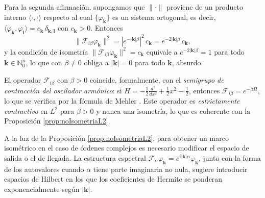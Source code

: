 \begin{Proof}
                Para la segunda afirmación, supongamos que $\|\cdot\|$ proviene de un producto interno $\langle\cdot,\cdot\rangle$ respecto al cual $\{\varphi_{\boldsymbol{k}}\}$ es un sistema ortogonal, es decir, $\langle \varphi_{\boldsymbol{k}},\varphi_{\boldsymbol{l}}\rangle = c_{\boldsymbol{k}}\,\delta_{\boldsymbol{k},\boldsymbol{l}}$ con $c_{\boldsymbol{k}}>0$. Entonces
                \begin{equation*}
                    \|\mathcal{F}_{i\beta}\varphi_{\boldsymbol{k}}\|^2 = |e^{-|\boldsymbol{k}|\beta}|^2\, c_{\boldsymbol{k}} = e^{-2|\boldsymbol{k}|\beta}\, c_{\boldsymbol{k}},
                \end{equation*}
                y la condición de isometría $\|\mathcal{F}_{i\beta}\varphi_{\boldsymbol{k}}\|^2 = c_{\boldsymbol{k}}$ equivale a $e^{-2|\boldsymbol{k}|\beta}=1$ para todo $\boldsymbol{k}\in\mathbb{N}_0^n$, lo que con $\beta\neq 0$ obliga a $|\boldsymbol{k}|=0$ para todo $\boldsymbol{k}$, absurdo.
            \end{Proof}

            \begin{remark}\label{rmk:semigrupo}
                El operador $\mathcal{F}_{i\beta}$ con $\beta>0$ coincide, formalmente, con el \emph{semigrupo de contracción del oscilador armónico}: si $H = -\tfrac{1}{2}\tfrac{d^2}{dx^2}+\tfrac{1}{2}x^2-\tfrac{1}{2}$, entonces $\mathcal{F}_{i\beta} = e^{-\beta H}$, lo que se verifica por la fórmula de Mehler \citep{morse19781953methods,folland1989harmonic,thangavelu1993lectures}. Este operador es \emph{estrictamente contractivo} en $L^2$ para $\beta > 0$ y nunca una isometría, lo que es coherente con la Proposición \ref{prop:noIsometriaL2}.
            \end{remark}


            A la luz de la Proposición \ref{prop:noIsometriaL2}, para obtener un marco isométrico en el caso de órdenes complejos es necesario modificar el espacio de salida o el de llegada. La estructura espectral $\mathcal{F}_\alpha \varphi_{\boldsymbol{k}} = e^{i|\boldsymbol{k}|\alpha}\varphi_{\boldsymbol{k}}$, junto con la forma de los autovalores cuando $\alpha$ tiene parte imaginaria no nula, sugiere introducir espacios de Hilbert en los que los coeficientes de Hermite se ponderan exponencialmente según $|\boldsymbol{k}|$.

